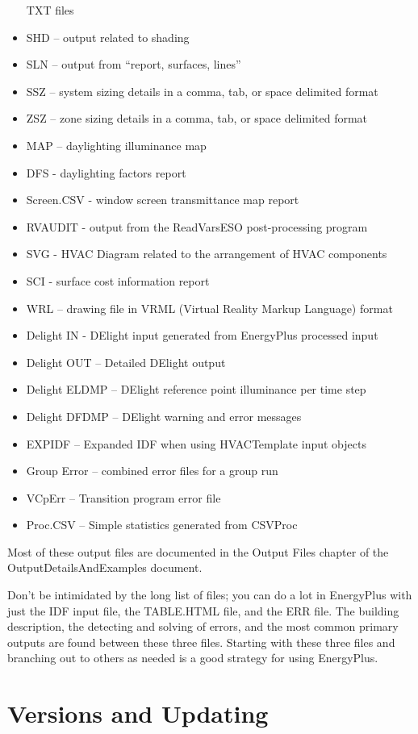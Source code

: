 \begin{itemize}
TXT files
\item SHD -- output related to shading
\item SLN -- output from \textquotedblleft report, surfaces, lines\textquotedblright{}
\item SSZ -- system sizing details in a comma, tab, or space delimited
format
\item ZSZ -- zone sizing details in a comma, tab, or space delimited format
\item MAP -- daylighting illuminance map
\item DFS - daylighting factors report
\item Screen.CSV - window screen transmittance map report
\item RVAUDIT - output from the ReadVarsESO post-processing program
\item SVG - HVAC Diagram related to the arrangement of HVAC components
\item SCI - surface cost information report
\item WRL -- drawing file in VRML (Virtual Reality Markup Language) format
\item Delight IN - DElight input generated from EnergyPlus processed input
\item Delight OUT -- Detailed DElight output
\item Delight ELDMP -- DElight reference point illuminance per time step
\item Delight DFDMP -- DElight warning and error messages
\item EXPIDF -- Expanded IDF when using HVACTemplate input objects
\item Group Error -- combined error files for a group run
\item VCpErr -- Transition program error file
\item Proc.CSV -- Simple statistics generated from CSVProc
\end{itemize}
Most of these output files are documented in the Output Files chapter
of the OutputDetailsAndExamples document.

Don't be intimidated by the long list of files; you can do a lot in
EnergyPlus with just the IDF input file, the TABLE.HTML file, and
the ERR file. The building description, the detecting and solving
of errors, and the most common primary outputs are found between these
three files. Starting with these three files and branching out to
others as needed is a good strategy for using EnergyPlus.

\section{Versions and Updating}


